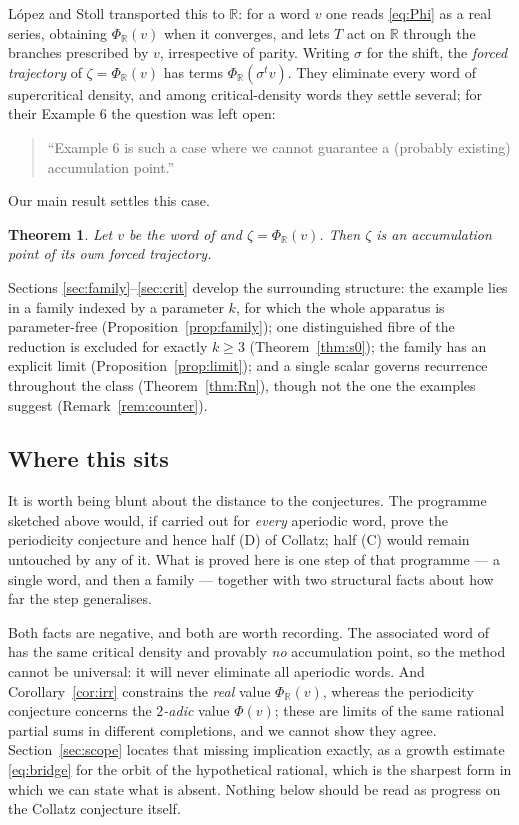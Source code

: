 \documentclass[11pt,a4paper]{article}
\theoremstyle{plain}
\newtheorem{theorem}{Theorem}
\theoremstyle{definition}
\newcommand{\R}{\mathbb{R}}
\begin{document}
L\'opez and Stoll \cite{LS} transported this to $\R$: for a word $v$ one reads \eqref{eq:Phi} as a
real series, obtaining $\Phi_\R(v)$ when it converges, and lets $T$ act on $\R$ through the branches
prescribed by $v$, irrespective of parity. Writing $\sigma$ for the shift, the \emph{forced
trajectory} of $\zeta=\Phi_\R(v)$ has terms $\Phi_\R(\sigma^tv)$. They eliminate every word of
supercritical density, and among critical-density words they settle several; for their Example 6
the question was left open:

\begin{quote}
``Example 6 is such a case where we cannot guarantee a (probably existing) accumulation point.''
\cite[p.~4]{LS}
\end{quote}

Our main result settles this case.

\begin{theorem}\label{thm:main}
Let $v$ be the word of \cite[\S14]{LS} and $\zeta=\Phi_\R(v)$. Then $\zeta$ is an accumulation point
of its own forced trajectory.
\end{theorem}

Sections \ref{sec:family}--\ref{sec:crit} develop the surrounding structure: the example lies in a
family indexed by a parameter $k$, for which the whole apparatus is parameter-free
(Proposition~\ref{prop:family}); one distinguished fibre of the reduction is excluded for exactly
$k\ge3$ (Theorem~\ref{thm:s0}); the family has an explicit limit (Proposition~\ref{prop:limit}); and
a single scalar governs recurrence throughout the class (Theorem~\ref{thm:Rn}), though not the one
the examples suggest (Remark~\ref{rem:counter}).

\subsection*{Where this sits}

It is worth being blunt about the distance to the conjectures. The programme sketched above would,
if carried out for \emph{every} aperiodic word, prove the periodicity conjecture and hence half (D)
of Collatz; half (C) would remain untouched by any of it. What is proved here is one step of that
programme --- a single word, and then a family --- together with two structural facts about how far
the step generalises.

Both facts are negative, and both are worth recording. The associated word of
\cite[Example 7]{LS} has the same critical density and provably \emph{no} accumulation point, so the
method cannot be universal: it will never eliminate all aperiodic words. And
Corollary~\ref{cor:irr} constrains the \emph{real} value $\Phi_\R(v)$, whereas the periodicity
conjecture concerns the \emph{$2$-adic} value $\Phi(v)$; these are limits of the same rational
partial sums in different completions, and we cannot show they agree. Section~\ref{sec:scope}
locates that missing implication exactly, as a growth estimate \eqref{eq:bridge} for the orbit of
the hypothetical rational, which is the sharpest form in which we can state what is absent. Nothing
below should be read as progress on the Collatz conjecture itself.
\end{document}
